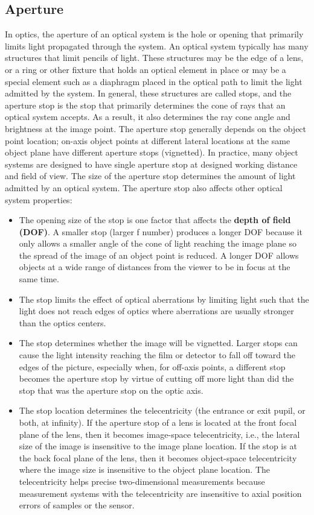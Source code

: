 \subsection{Aperture}
In optics, the aperture of an optical system is the hole or opening that primarily limits light propagated through the system. An optical system typically has many structures that limit pencils of light. These structures may be the edge of a lens, or a ring or other fixture that holds an optical element in place or may be a special element such as a diaphragm placed in the optical path to limit the light admitted by the system.
In general, these structures are called stops, and the aperture stop is the stop that primarily determines the cone of rays that an optical system accepts. As a result, it also determines the ray cone angle and brightness at the image point. The aperture stop generally depends on the object point location; on-axis object points at different lateral locations at the same object plane have different aperture stops (vignetted). In practice, many object systems are designed to have single aperture stop at designed working distance and field of view.
\nl
The size of the aperture stop determines the amount of light admitted by an optical system. The aperture stop also affects other optical system properties:
\begin{itemize}
    \item The opening size of the stop is one factor that affects the \textbf{depth of field (DOF)}. A smaller stop (larger f number) produces a longer DOF because it only allows a smaller angle of the cone of light reaching the image plane so the spread of the image of an object point is reduced. A longer DOF allows objects at a wide range of distances from the viewer to be in focus at the same time.
    \item The stop limits the effect of optical aberrations by limiting light such that the light does not reach edges of optics where aberrations are usually stronger than the optics centers.
    \item The stop determines whether the image will be vignetted. Larger stops can cause the light intensity reaching the film or detector to fall off toward the edges of the picture, especially when, for off-axis points, a different stop becomes the aperture stop by virtue of cutting off more light than did the stop that was the aperture stop on the optic axis.
    \item The stop location determines the telecentricity (the entrance or exit pupil, or both, at infinity). If the aperture stop of a lens is located at the front focal plane of the lens, then it becomes image-space telecentricity, i.e., the lateral size of the image is insensitive to the image plane location. If the stop is at the back focal plane of the lens, then it becomes object-space telecentricity where the image size is insensitive to the object plane location. The telecentricity helps precise two-dimensional measurements because measurement systems with the telecentricity are insensitive to axial position errors of samples or the sensor.
\end{itemize}
